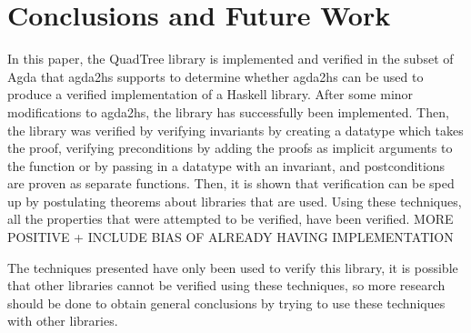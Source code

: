 \section{Conclusions and Future Work}
In this paper, the QuadTree library is implemented and verified in the subset of Agda that agda2hs supports to determine whether agda2hs can be used to produce a verified implementation of a Haskell library. After some minor modifications to agda2hs, the library has successfully been implemented. Then, the library was verified by verifying invariants by creating a datatype which takes the proof, verifying preconditions by adding the proofs as implicit arguments to the function or by passing in a datatype with an invariant, and postconditions are proven as separate functions.  Then, it is shown that verification can be sped up by postulating theorems about libraries that are used. Using these techniques, all the properties that were attempted to be verified, have been verified. MORE POSITIVE + INCLUDE BIAS OF ALREADY HAVING IMPLEMENTATION

The techniques presented have only been used to verify this library, it is possible that other libraries cannot be verified using these techniques, so more research should be done to obtain general conclusions by trying to use these techniques with other libraries.
